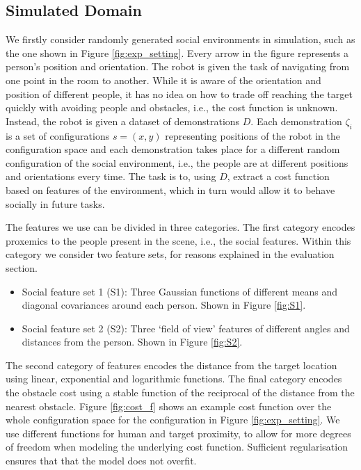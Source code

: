 \documentclass{article}  %
\begin{document}
	\subsection{Simulated Domain}
	We firstly consider randomly generated social environments in simulation, such as the one shown in Figure \ref{fig:exp_setting}. Every arrow in the figure represents a person's position and orientation. The robot is given the task of navigating from one point in the room to another. While it is aware of the orientation and position of different people, it has no idea on how to trade off reaching the target quickly with avoiding people and obstacles, i.e., the cost function is unknown. Instead, the robot is given a dataset of demonstrations $D$. Each demonstration $\zeta_i$ is a set of configurations $s = (x,y)$ representing positions of the robot in the configuration space and each demonstration takes place for a different random configuration of the social environment, i.e., the people are at different positions and orientations every time. The task is to, using $D$, extract a cost function based on features of the environment, which in turn would allow it to behave socially in future tasks.


	The features we use can be divided in three categories. The first category encodes proxemics to the people present in the scene, i.e., the social features. Within this category we consider two feature sets, for reasons explained in the evaluation section.
	\begin{itemize}
		\item Social feature set 1 (S1): Three Gaussian functions of different means and diagonal covariances around each person. Shown in Figure \ref{fig:S1}.
		\item Social feature set 2 (S2): Three `field of view' features of different angles and distances from the person. Shown in Figure \ref{fig:S2}.
	\end{itemize}
	  The second category of features encodes the distance from the target location using linear, exponential and logarithmic functions. The final category encodes the obstacle cost using a stable function of the reciprocal of the distance from the nearest obstacle. Figure \ref{fig:cost_f} shows an example cost function over the whole configuration space for the configuration in Figure \ref{fig:exp_setting}. We use different functions for human and target proximity, to allow for more degrees of freedom when modeling the underlying cost function. Sufficient regularisation ensures that that the model does not overfit.
\end{document}
